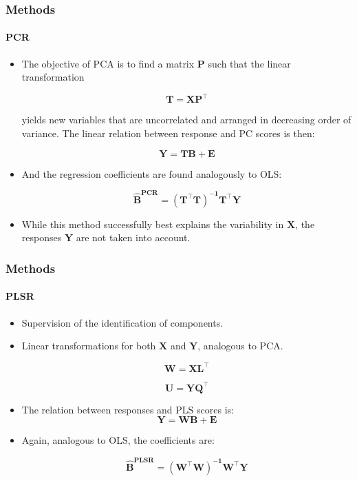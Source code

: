 \documentclass{beamer}
\begin{document}
\begin{frame}
	\frametitle{Methods}
	\framesubtitle{PCR}
	
	\begin{itemize}
	\pause
	\item The objective of PCA is to find a matrix $\mathbf{P}$ such that the linear transformation
	
		\begin{equation}
			\label{eqn:pca}
			\mathbf{T=XP^\intercal}
		\end{equation}
	
yields new variables that are uncorrelated and arranged in decreasing order of variance. The linear relation between response and PC scores is then:

	\begin{equation}
		\label{eqn:pcr}
		\mathbf{Y = T B + E}
	\end{equation}
\pause
\item And the regression coefficients are found analogously to OLS:

	\begin{equation}
		\label{eqn:beta-pcr}
		\mathbf{\hat{B}^{\text{PCR}} = (T^\intercal T)^{-1}T^\intercal Y}
	\end{equation}
\pause
\item While this method successfully best explains the variability in $\mathbf{X}$, the responses $\mathbf{Y}$ are not taken into account.
\end{itemize}
\end{frame}	

\begin{frame}
	\frametitle{Methods}
	\framesubtitle{PLSR}
	
	\begin{itemize}
	\pause
	\item Supervision of the identification of components.
	\pause
	\item Linear transformations for both $\mathbf{X}$ and $\mathbf{Y}$, analogous to PCA.
	
	\begin{equation}
	\label{eqn:x-decomp}
	\mathbf{W=XL^\intercal}
	\end{equation}

\begin{equation}
	\label{eqn:y-decomp}
	\mathbf{U = YQ^\intercal}
\end{equation}

\pause
\item The relation between responses and PLS scores is:
	\begin{equation}
	\label{eqn:plsr}
	\mathbf{Y = WB + E}
\end{equation}
\pause
\item Again, analogous to OLS, the coefficients are:

\begin{equation}
	\label{eqn:beta-plsr}
	\mathbf{\hat{B}^{\text{PLSR}} = (W^\intercal W)^{-1}W^\intercal Y}
\end{equation}
\end{itemize}
		
\end{frame}
\end{document}
